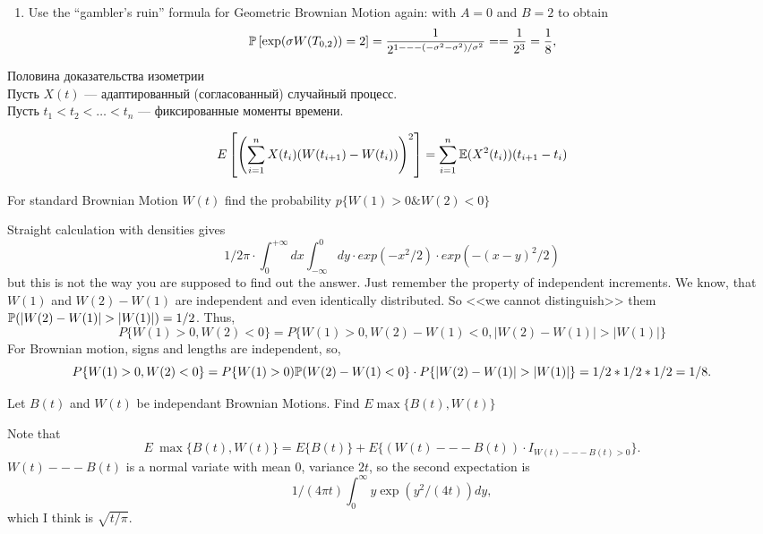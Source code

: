 \begin{solution}
\begin{solution}
\begin{solution}
\begin{solution}
\begin{solution}
\begin{solution}
\begin{solution}
\begin{solution}
\begin{solution}
\begin{solution}
{\begin{solution}
\begin{enumerate}
  \item Use the ``gambler's ruin'' formula for Geometric
  Brownian Motion again:
  with $A = 0$ and $B = 2$ to obtain
  $$
     \P\left[ 
          \exp(\sigma W(T_{0,2})) = 2
          \right] =
          \frac{1}
               {2^{1 --- (-\sigma^2-\sigma^2)/\sigma^2}} =
            = \frac{1}{2^3} = \frac{1}{8},
  $$

\end{enumerate}
\end{solution}

\begin{problem}
 Половина доказательства изометрии \\
Пусть $X(t)$ --- адаптированный (согласованный) случайный процесс. \\
Пусть $t_{1}<t_{2}<\ldots<t_{n}$ --- фиксированные моменты времени. \\

\end{problem} 
\begin{solution} 
$$E\left[\left(\sum_{i=1}^{n}X(t_{i})(W(t_{i+1})-W(t_{i}))\right)^{2}\right]=\sum_{i=1}^{n}\E(X^{2}(t_{i}))(t_{i+1}-t_{i})$$
\end{solution}

\begin{problem}
For standard Brownian Motion $W(t)$ find the probability $p \{ W(1)>0 \& W(2)<0 \}$ 

\end{problem} 
\begin{solution} 
Straight calculation with densities gives
$$
  1/2\pi \cdot \int_0^{+\infty}{dx} \int_{-\infty}^0 dy \cdot exp(-x^2/2) \cdot exp(-(x-y)^2/2)
$$
but this is not the way you are supposed to find out the answer.
Just remember the property of independent increments.
We know, that $W(1)$ and $W(2)-W(1)$ are independent and even identically distributed. 
So <<we cannot distinguish>>  them $\P( |W(2)-W(1)| > |W(1)| ) = 1/2$. Thus, 
$$
  P\{ W(1)>0, W(2)<0 \} = P\{ W(1)>0, W(2)-W(1) < 0, |W(2)-W(1)| > |W(1)| \}
$$
For Brownian motion, signs and lengths are independent, so,
$$
  P\{ W(1)>0, W(2)<0 \} = P\{ W(1)>0) \P(W(2)-W(1) < 0\} \cdot P\{|W(2)-W(1)| > |W(1)|\} = 1/2*1/2*1/2=1/8.
$$ 
\end{solution}

\begin{problem}
Let $B(t)$ and $W(t)$ be independant Brownian Motions. Find $E\max\{B(t),W(t)\}$ 

\end{problem} 
\begin{solution} 
Note that
$$
  E\ \max\{B(t),W(t)\} =  E \{B(t)\} + E\{(W(t) --- B(t))\cdot I_{W(t) --- B(t) >0}\}.
$$
$W(t) --- B(t)$ is a normal variate with mean $0$, variance $2t$, so the second expectation is 
$$
  1/(4\pi t)\int_0^\infty y \exp(y^2/(4t))dy,
$$ 
which I think is $\sqrt{t/\pi}$. 
\end{solution}

}
\end{solution}
\end{solution}
\end{solution}
\end{solution}
\end{solution}
\end{solution}
\end{solution}
\end{solution}
\end{solution}
\end{solution}
